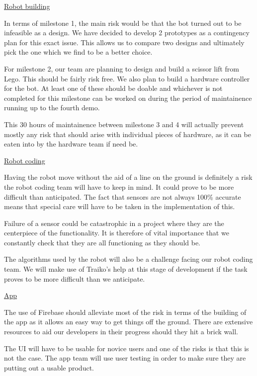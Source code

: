 \documentclass{article}
\begin{document}
\underline{Robot building}

In terms of milestone 1, the main risk would be that the bot turned out to be infeasible as a design. We have decided to develop 2 prototypes as a contingency plan for this exact issue. This allows us to compare two designs and ultimately pick the one which we find to be a better choice.

For milestone 2, our team are planning to design and build a scissor lift from Lego. This should be fairly risk free. We also plan to build a hardware controller for the bot. At least one of these should be doable and whichever is not completed for this milestone can be worked on during the period of maintainence running up to the fourth demo.

This 30 hours of maintainence between milestone 3 and 4 will actually prevent mostly any risk that should arise with individual pieces of hardware, as it can be eaten into by the hardware team if need be.

\underline{Robot coding}

Having the robot move without the aid of a line on the ground is definitely a risk the robot coding team will have to keep in mind. It could prove to be more difficult than anticipated. The fact that sensors are not always 100\% accurate means that special care will have to be taken in the implementation of this.

Failure of a sensor could be catastrophic in a project where they are the centerpiece of the functionality. It is therefore of vital importance that we constantly check that they are all functioning as they should be.

The algorithms used by the robot will also be a challenge facing our robot coding team. We will make use of Traiko's help at this stage of development if the task proves to be more difficult than we anticipate.

\underline{App}

The use of Firebase should alleviate most of the risk in terms of the building of the app as it allows an easy way to get things off the ground. There are extensive resources to aid our developers in their progress should they hit a brick wall.

The UI will have to be usable for novice users and one of the risks is that this is not the case. The app team will use user testing in order to make sure they are putting out a usable product.
\end{document}
